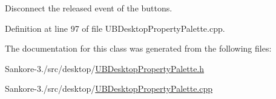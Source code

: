 Disconnect the released event of the buttons. 



Definition at line 97 of file U\-B\-Desktop\-Property\-Palette.\-cpp.



The documentation for this class was generated from the following files\-:\begin{DoxyCompactItemize}
\item 
Sankore-\/3./src/desktop/\hyperlink{_u_b_desktop_property_palette_8h}{U\-B\-Desktop\-Property\-Palette.\-h}\item 
Sankore-\/3./src/desktop/\hyperlink{_u_b_desktop_property_palette_8cpp}{U\-B\-Desktop\-Property\-Palette.\-cpp}\end{DoxyCompactItemize}
